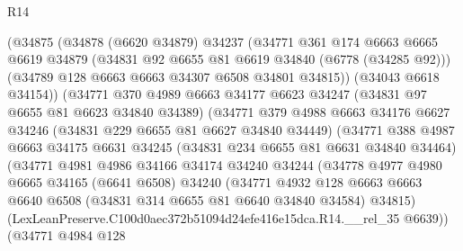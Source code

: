 \begin{lexlean}{R14}
\begin{coremodule}
                    (@34875
                      (@34878
                        (@6620 @34879)
                        @34237
                        (@34771
                          @361
                          @174
                          @6663
                          @6665
                          @6619
                          @34879
                          (@34831 @92 @6655 @81 @6619 @34840 (@6778 (@34285 @92)))
                          (@34789 @128 @6663 @6663 @34307 @6508 @34801 @34815))
                        (@34043 @6618 @34154))
                      (@34771
                        @370
                        @4989
                        @6663
                        @34177
                        @6623
                        @34247
                        (@34831 @97 @6655 @81 @6623 @34840 @34389)
                        (@34771
                          @379
                          @4988
                          @6663
                          @34176
                          @6627
                          @34246
                          (@34831 @229 @6655 @81 @6627 @34840 @34449)
                          (@34771
                            @388
                            @4987
                            @6663
                            @34175
                            @6631
                            @34245
                            (@34831 @234 @6655 @81 @6631 @34840 @34464)
                            (@34771
                              @4981
                              @4986
                              @34166
                              @34174
                              @34240
                              @34244
                              (@34778
                                @4977
                                @4980
                                @6665
                                @34165
                                (@6641 @6508)
                                @34240
                                (@34771
                                  @4932
                                  @128
                                  @6663
                                  @6663
                                  @6640
                                  @6508
                                  (@34831 @314 @6655 @81 @6640 @34840 @34584)
                                  @34815)
                                (LexLeanPreserve.C100d0aec372b51094d24efe416e15dca.R14.__rel_35
                                  @6639))
                              (@34771
                                @4984
                                @128

\end{coremodule}
\end{lexlean}
